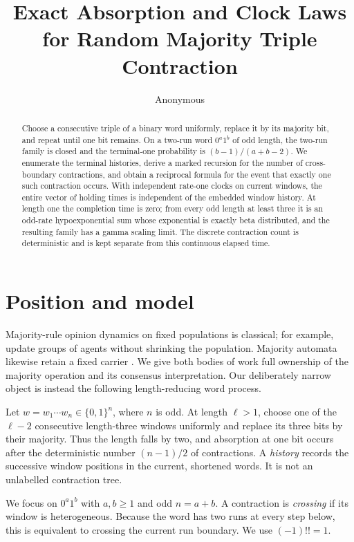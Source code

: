 \documentclass[10pt,a4paper]{amsart}
\title{Exact Absorption and Clock Laws for Random Majority Triple Contraction}
\author{Anonymous}
\date{}
\theoremstyle{remark}
\newcommand{\1}{\mathbf 1}
\begin{document}
\begin{abstract}
Choose a consecutive triple of a binary word uniformly, replace it by its
majority bit, and repeat until one bit remains.  On a two-run word
$0^a1^b$ of odd length, the two-run family is closed and the terminal-one
probability is $(b-1)/(a+b-2)$.  We enumerate the terminal histories, derive
a marked recursion for the number of cross-boundary contractions, and obtain
a reciprocal formula for the event that exactly one such contraction occurs.
With independent rate-one clocks on current windows, the entire vector of
holding times is independent of the embedded window history.  At length one
the completion time is zero; from every odd length at least three it is an
odd-rate hypoexponential sum whose exponential is exactly beta distributed,
and the resulting family has a gamma scaling limit.  The discrete contraction
count is deterministic and is kept separate from this continuous elapsed time.
\end{abstract}

\maketitle

\section{Position and model}

Majority-rule opinion dynamics on fixed populations is classical; for
example, \citet{krapivskyredner2003} update groups of agents without shrinking
the population.  Majority automata likewise retain a fixed carrier
\citep{golesetal2016}.  We give both bodies of work full ownership of the
majority operation and its consensus interpretation.  Our deliberately narrow
object is instead the following length-reducing word process.

Let $w=w_1\cdots w_n\in\{0,1\}^n$, where $n$ is odd.  At length
$\ell>1$, choose one of the $\ell-2$ consecutive length-three windows
uniformly and replace its three bits by their majority.  Thus the length falls
by two, and absorption at one bit occurs after the deterministic number
$(n-1)/2$ of contractions.  A \emph{history} records the successive window
positions in the current, shortened words.  It is not an unlabelled
contraction tree.

We focus on $0^a1^b$ with $a,b\geq1$ and odd $n=a+b$.  A contraction is
\emph{crossing} if its window is heterogeneous.  Because the word has two
runs at every step below, this is equivalent to crossing the current run
boundary.  We use $(-1)!!=1$.
\end{document}
